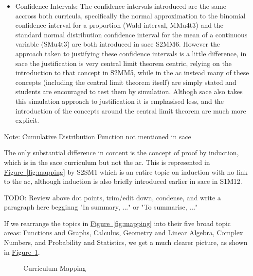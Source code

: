 \documentclass[twoside,12pt,a4paper]{report}
\newcommand{\reffig}[1]{\hyperref[fig:#1]{Figure~\ref{fig:#1}}}
\begin{document}
\begin{itemize}
\begin{itemize}
			\item Confidence Intervals: The confidence intervals introduced are the same accross both curricula, specifically the normal approximation to the binomial confidence interval for a proportion (Wald interval, MMu4t3) and the standard normal distribution confidence interval for the mean of a continuous variable (SMu4t3) are both introduced in \gls{sace} S2MM6. However the approach taken to justifying these confidence intervals is a little difference, in \gls{sace} the justification is very central limit theorem centric, relying on the introduction to that concept in S2MM5, while in the \gls{ac} instead many of these concepts (including the central limit theorem itself) are simply stated and students are encouraged to test them by simulation. Althogh \gls{sace} also takes this simulation approach to justification it is emphasised less, and the introduction of the concepts around the central limit theorem are much more explicit.
		\end{itemize}
\end{itemize}

Note: Cumulative Distribution Function not mentioned in \gls{sace}

The only substantial difference in content is the concept of proof by induction, which is in the \gls{sace} curriculum but not the \gls{ac}. This is represented in \reffig{mapping} by S2SM1 which is an entire topic on induction with no link to the \gls{ac}, although induction is also briefly introduced earlier in \gls{sace} in S1M12.


TODO: Review above dot points, trim/edit down, condense, and write a paragraph here begginng "In summary, ..." or "To summarise, ..." 


If we rearrange the topics in \reffig{mapping} into their five broad topic areas: Functions and Graphs, Calculus, Geometry and Linear Algebra, Complex Numbers, and Probability and Statistics, we get a much clearer picture, as shown in \reffig{mappingByTopic}.

\clearpage

\pagestyle{empty}

\begin{figure}[p]
\begin{center}

\caption{Curriculum Mapping\label{fig:mappingByTopic}}
\end{center}
\end{figure}

\clearpage
\end{document}
